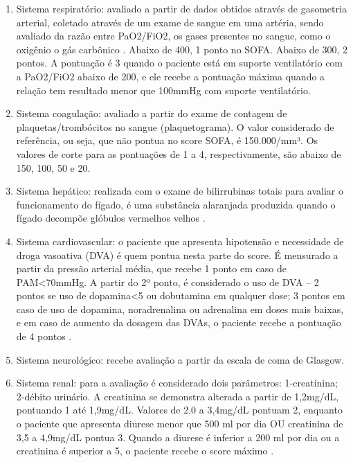 \documentclass[12pt]{article}
\begin{document}
\begin{enumerate}
    \item Sistema respiratório: avaliado a partir de dados obtidos através de gasometria arterial, coletado através de um exame de sangue em uma artéria, sendo avaliado da razão entre PaO2/FiO2, os gases presentes no sangue, como o oxigênio o gás carbônico \cite{mota2010disturbios}. Abaixo de 400, 1 ponto no SOFA. Abaixo de 300, 2 pontos. A pontuação é 3 quando o paciente está em suporte ventilatório com a PaO2/FiO2 abaixo de 200, e ele recebe a pontuação máxima quando a relação tem resultado menor que 100mmHg com suporte ventilatório.
    
    \item Sistema coagulação: avaliado a partir do exame de contagem de plaquetas/trombócitos no sangue (plaquetograma). O valor considerado de referência, ou seja, que não pontua no score SOFA, é 150.000/mm³. Os valores de corte para as pontuações de 1 a 4, respectivamente, são abaixo de 150, 100, 50 e 20.
    
    \item Sistema hepático: realizada com o exame de bilirrubinas totais para avaliar o funcionamento do fígado, é uma substância alaranjada produzida quando o fígado decompõe glóbulos vermelhos velhos \cite{lambden2019sofa}.
    
    \item Sistema cardiovascular: o paciente que apresenta hipotensão e necessidade de droga vasoativa (DVA) é quem pontua nesta parte do score. É mensurado a partir da pressão arterial média, que recebe 1 ponto em caso de PAM<70mmHg. A partir do 2º ponto, é considerado o uso de DVA – 2 pontos se uso de dopamina<5 ou dobutamina em qualquer dose;  3 pontos em caso de uso de dopamina, noradrenalina ou adrenalina em doses mais baixas, e em caso de aumento da dosagem das DVAs, o paciente recebe a pontuação de 4 pontos \cite{nakashima2020intervindo}.
    
    \item Sistema neurológico: recebe avaliação a partir da escala de coma de Glasgow.
    
    \item Sistema renal: para a avaliação é considerado dois parâmetros: 1-creatinina; 2-débito urinário. A creatinina se demonstra alterada a partir de 1,2mg/dL, pontuando 1 até 1,9mg/dL. Valores de 2,0 a 3,4mg/dL pontuam 2, enquanto o paciente que apresenta diurese menor que 500 ml por dia OU creatinina de 3,5 a 4,9mg/dL pontua 3. Quando a diurese é inferior a 200 ml por dia ou a creatinina é superior a 5, o paciente recebe o score máximo \cite{lambden2019sofa}.
    
\end{enumerate}
\end{document}
